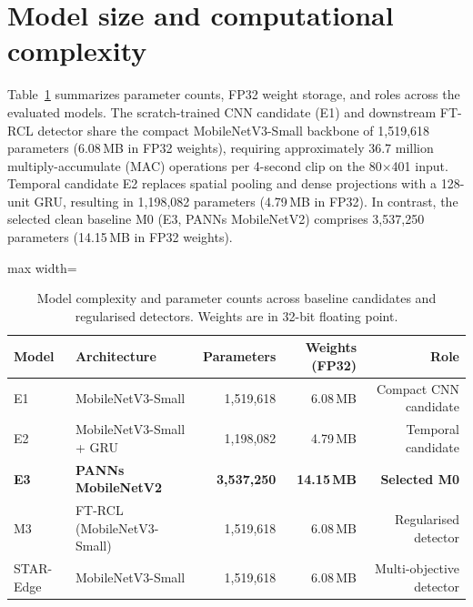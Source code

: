 
\section{Model size and computational complexity}
\label{sec:efficiency}

Table~\ref{tab:efficiency} summarizes parameter counts, FP32 weight storage, and roles across the evaluated models. The scratch-trained CNN candidate (E1) and downstream FT-RCL detector share the compact MobileNetV3-Small backbone of 1{,}519{,}618 parameters (6.08\,MB in FP32 weights), requiring approximately 36.7 million multiply-accumulate (MAC) operations per 4-second clip on the 80$\times$401 input. Temporal candidate E2 replaces spatial pooling and dense projections with a 128-unit GRU, resulting in 1{,}198{,}082 parameters (4.79\,MB in FP32). In contrast, the selected clean baseline M0 (E3, PANNs MobileNetV2) comprises 3{,}537{,}250 parameters (14.15\,MB in FP32 weights).

\begin{table}[htbp]
\centering
\caption{Model complexity and parameter counts across baseline candidates and regularised detectors. Weights are in 32-bit floating point.}
\label{tab:efficiency}
\small
\begin{adjustbox}{max width=\textwidth}
\begin{tabular}{@{}llrrr@{}}
\toprule
Model & Architecture & Parameters & Weights (FP32) & Role \\
\midrule
E1 & MobileNetV3-Small & 1{,}519{,}618 & 6.08\,MB & Compact CNN candidate \\
E2 & MobileNetV3-Small + GRU & 1{,}198{,}082 & 4.79\,MB & Temporal candidate \\
\textbf{E3} & \textbf{PANNs MobileNetV2} & \textbf{3{,}537{,}250} & \textbf{14.15\,MB} & \textbf{Selected M0} \\
\midrule
M3 & FT-RCL (MobileNetV3-Small) & 1{,}519{,}618 & 6.08\,MB & Regularised detector \\
STAR-Edge & MobileNetV3-Small & 1{,}519{,}618 & 6.08\,MB & Multi-objective detector \\
\bottomrule
\end{tabular}
\end{adjustbox}
\end{table}

